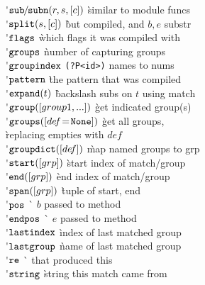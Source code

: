 \begin{tabbing}
\'$\mathop{\mathtt{sub}}\hspace{-.25em}/\hspace{-.25em}\mathop{\mathtt{subn}}(r, s, {[}{c}{]})$ \` similar to module funcs \\
\'$\mathop{\mathtt{split}}(s, {[}{c}{]})$ \` but compiled, and $b,\!e$ substr \\
\'$\mathtt{flags}$ \` which flags it was compiled with \\
\'$\mathtt{groups}$ \` number of capturing groups \\
\'$\mathtt{groupindex}$ \` \verb.(?P<id>). names to nums \\
\'$\mathtt{pattern}$ \` the pattern that was compiled \\
\'$\mathop{\mathtt{expand}}(t)$ \` backslash$\!$ subs$\!$ on$\!$ $t\!$ using$\!$ match \\
\'$\mathop{\mathtt{group}}({[}{group1, ...}{]})$ \` get indicated group(s) \\
\'$\mathop{\mathtt{groups}}({[}{de\!f\!=\!\mathtt{None}}{]})$ \` get all groups, \\ \` replacing empties with $de\!f$ \\
\'$\mathop{\mathtt{groupdict}}({[}{de\!f}{]})$ \` map$\!$ named$\!$ groups$\!$ to$\!$ grp \\
\'$\mathop{\mathtt{start}}({[}{grp}{]})$ \` start index of match/group \\
\'$\mathop{\mathtt{end}}({[}{grp}{]})$ \` end index of match/group \\
\'$\mathop{\mathtt{span}}({[}{grp}{]})$ \` tuple of start, end \\
\'$\mathop{\mathtt{pos}}$ \` $b$ passed to  method \\
\'$\mathop{\mathtt{endpos}}$ \` $e$ passed to  method \\
\'$\mathop{\mathtt{lastindex}}$ \` index of last matched group \\
\'$\mathop{\mathtt{lastgroup}}$ \` name of last matched group \\
\'$\mathop{\mathtt{re}}$ \`  that produced this \\
\'$\mathop{\mathtt{string}}$ \` string this match came from \\
\end{tabbing}

